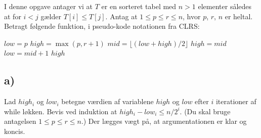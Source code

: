 \documentclass{article}
\theoremstyle{definition}
\begin{document}
I denne opgave antager vi at $T$ er en sorteret tabel med $n > 1$ elementer således at for $i < j$ gælder $T[i] \leq T[j]$. Antag at $1 \leq p \leq r \leq n$, hvor $p$, $r$, $n$ er heltal. Betragt følgende funktion, i pseudo-kode notationen fra CLRS:

\begin{algorithmic}[1]
    \State $low = p$
    \State $high = \max(p,r+1)$
        \State $mid = \lfloor(low + high)/2\rfloor$
            \State $high = mid$
        \Else
            \State $low = mid + 1$
        \EndIf
    \EndWhile
    \State \Return $high$
\EndFunction
\end{algorithmic}

\subsection*{a)} Lad $high_i$ og $low_i$ betegne værdien af variablene $high$ og $low$ efter $i$ iterationer af while løkken. Bevis ved induktion at $high_i - low_i \leq n/2^i$. (Du skal bruge antagelsen $1 \leq p \leq r \leq n$.) Der lægges vægt på, at argumentationen er klar og koncis.
\end{document}
